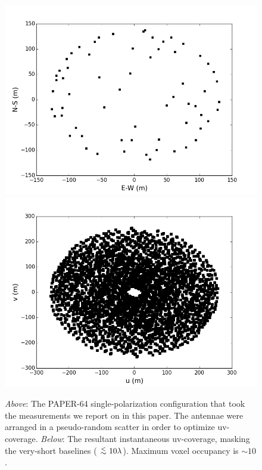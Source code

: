 \documentclass[useAMS,usenatbib]{mn2e}
\newcommand {\aplt} {\ {\raise-.5ex\hbox{$\buildrel<\over\sim$}}\ }
\begin{document}

\begin{figure}
\includegraphics[width=\columnwidth]{figs/psa64imageconfig.png}
\includegraphics[width=\columnwidth]{figs/psa64uvcoverage.png}
\caption{\textit{Above}: The PAPER-64 single-polarization configuration that took the measurements we report on in this paper. The antennae were arranged in a pseudo-random scatter in order to optimize uv-coverage. \textit{Below}: The resultant instantaneous uv-coverage, masking the very-short baselines ($\aplt 10 \lambda$). Maximum voxel occupancy is $\sim10$.}
\label{fig:config}
\end{figure}
\end{document}
